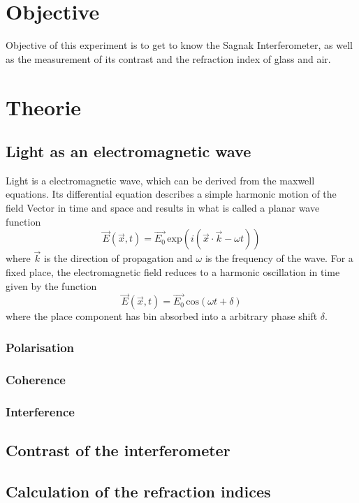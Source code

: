 \section{Objective}
\label{sec:Zielsetzung}
    Objective of this experiment is to get to know the Sagnak Interferometer, as well as the measurement of its contrast and the refraction index of glass and air.
\section{Theorie}
\label{sec:Theorie}
\subsection{Light as an electromagnetic wave}
Light is a electromagnetic wave, which can be derived from the maxwell equations. Its differential equation describes a simple harmonic motion of the field Vector in time and space and results in 
what is called a planar wave function
\begin{equation}
    \vec{E}\left(\vec{x}, t\right) = \vec{E_0} \, \text{exp} \left(i \left(\vec{x} \cdot \vec{k} - \omega t\right)\right)
\end{equation}
where $\vec{k}$ is the direction of propagation and $\omega$ is the frequency of the wave.
For a fixed place, the electromagnetic field reduces to a harmonic oscillation in time given by the function
\begin{equation}
    \vec{E}\left(\vec{x}, t\right) = \vec{E_0} \, \text{cos} \left(\omega t + \delta\right)
\end{equation}
where the place component has bin absorbed into a arbitrary phase shift $\delta$.
\subsubsection{Polarisation}
\subsubsection{Coherence}
\subsubsection{Interference}
\subsection{Contrast of the interferometer}
\subsection{Calculation of the refraction indices}
\cite{sample}

\newpage
